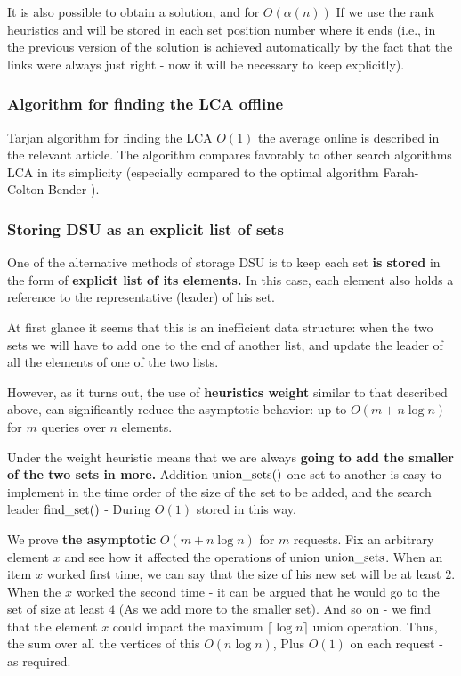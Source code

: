 It is also possible to obtain a solution, and for $O (\alpha (n))$ If we use the rank heuristics and will be stored in each set position number where it ends (i.e., in the previous version of the solution is achieved automatically by the fact that the links were always just right - now it will be necessary to keep explicitly).

\subsubsection{ Algorithm for finding the LCA offline }

Tarjan algorithm for finding the LCA $O (1)$ the average online is described in the relevant article. The algorithm compares favorably to other search algorithms LCA in its simplicity (especially compared to the optimal algorithm Farah-Colton-Bender ).

\subsubsection{ Storing DSU as an explicit list of sets }

One of the alternative methods of storage DSU is to keep each set \textbf{is stored} in the form of \textbf{explicit list of its elements.} In this case, each element also holds a reference to the representative (leader) of his set.

At first glance it seems that this is an inefficient data structure: when the two sets we will have to add one to the end of another list, and update the leader of all the elements of one of the two lists.

However, as it turns out, the use of \textbf{heuristics weight} similar to that described above, can significantly reduce the asymptotic behavior: up to $O (m + n \log n)$ for $m$ queries over $n$ elements.

Under the weight heuristic means that we are always \textbf{going to add the smaller of the two sets in more.} Addition ${\rm union \_sets}()$ one set to another is easy to implement in the time order of the size of the set to be added, and the search leader ${\rm find \_set}()$ - During $O (1)$ stored in this way.

We prove \textbf{the asymptotic} $O (m + n \log n)$ for $m$ requests. Fix an arbitrary element $x$ and see how it affected the operations of union ${\rm union \_sets}$. When an item $x$ worked first time, we can say that the size of his new set will be at least $2$. When the $x$ worked the second time - it can be argued that he would go to the set of size at least $4$ (As we add more to the smaller set). And so on - we find that the element $x$ could impact the maximum $\lceil \log n \rceil$ union operation. Thus, the sum over all the vertices of this $O (n \log n)$, Plus $O (1)$ on each request - as required.

